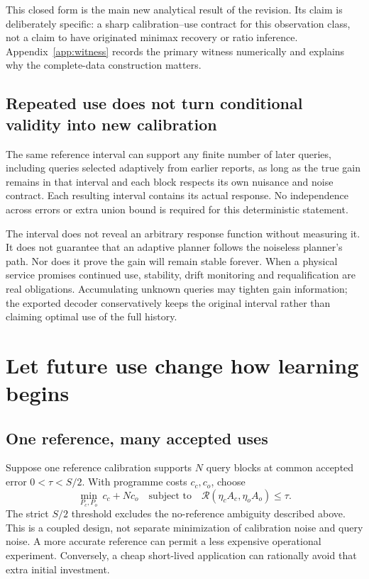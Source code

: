 \documentclass[11pt,letterpaper]{article}
\theoremstyle{definition}\newtheorem{definition}[theorem]{Definition}
\theoremstyle{remark}\newtheorem{remark}[theorem]{Remark}
\begin{document}
This closed form is the main new analytical result of the revision. Its claim is deliberately specific: a sharp calibration--use contract for this observation class, not a claim to have originated minimax recovery or ratio inference. Appendix~\ref{app:witness} records the primary witness numerically and explains why the complete-data construction matters.

\subsection{Repeated use does not turn conditional validity into new calibration}
The same reference interval can support any finite number of later queries, including queries selected adaptively from earlier reports, as long as the true gain remains in that interval and each block respects its own nuisance and noise contract. Each resulting interval contains its actual response. No independence across errors or extra union bound is required for this deterministic statement.

The interval does not reveal an arbitrary response function without measuring it. It does not guarantee that an adaptive planner follows the noiseless planner's path. Nor does it prove the gain will remain stable forever. When a physical service promises continued use, stability, drift monitoring and requalification are real obligations. Accumulating unknown queries may tighten gain information; the exported decoder conservatively keeps the original interval rather than claiming optimal use of the full history.

\section{Let future use change how learning begins}
\label{sec:reuse}
\subsection{One reference, many accepted uses}
Suppose one reference calibration supports $N$ query blocks at common accepted error $0<\tau<S/2$. With programme costs $c_c,c_o$, choose
\begin{equation}
 \min_{P_c,P_o}\ c_c+Nc_o
 \quad\text{subject to}\quad
 \mathcal R(\eta_cA_c,\eta_oA_o)\le\tau.
 \label{eq:jointdesign}
\end{equation}
The strict $S/2$ threshold excludes the no-reference ambiguity described above. This is a coupled design, not separate minimization of calibration noise and query noise. A more accurate reference can permit a less expensive operational experiment. Conversely, a cheap short-lived application can rationally avoid that extra initial investment.
\end{document}
